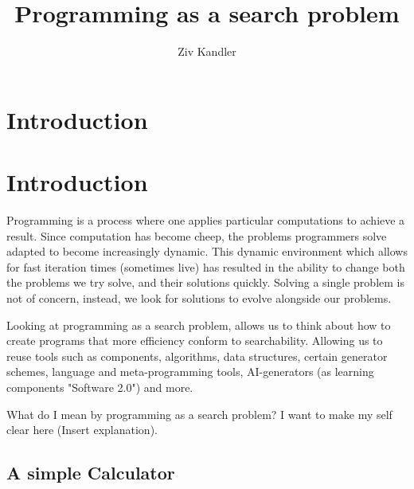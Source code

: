 \documentclass[a4paper]{article}
\title{\Huge{Programming as a search problem}}
\author{Ziv Kandler}
\begin{document}
\section{Introduction}

\section{Introduction}
Programming is a process where one applies particular computations to achieve a result.
Since computation has become cheep, the problems programmers solve adapted to become 
increasingly dynamic. This dynamic environment which allows for fast iteration times 
(sometimes live) has resulted in the ability to change both the problems we try solve, 
and their solutions quickly. Solving a single problem is not of concern, instead, we 
look for solutions to evolve alongside our problems.

Looking at programming as a search problem, allows us to think about how to create 
programs that more efficiency conform to searchability. Allowing us to reuse tools 
such as components, algorithms, data structures, certain generator schemes, language
and meta-programming tools, AI-generators (as learning components "Software 2.0") 
and more. 

What do I mean by programming as a search problem? I want to make my self clear here 
(Insert explanation).  

\subsection{A simple Calculator}
\end{document}
